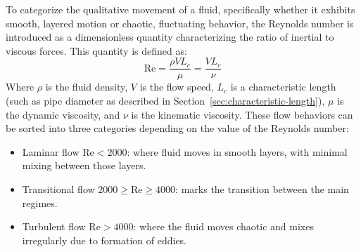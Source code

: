 
To categorize the qualitative movement of a fluid, specifically whether it exhibits smooth, layered motion or chaotic, fluctuating behavior, the Reynolds number is introduced as a dimensionless quantity characterizing the ratio of inertial to viscous forces.
This quantity is defined as:
\begin{equation}
	\mathrm{Re} = \frac{\rho V L_c}{\mu} = \frac{V L_c}{\nu}
	\label{eq:reynolds-number}
\end{equation}
Where $\rho$ is the fluid density, $V$ is the flow speed, $L_c$ is a characteristic length (such as pipe diameter as described in Section~\ref{sec:characteristic-length}), $\mu$ is the dynamic viscosity, and $\nu$ is the kinematic viscosity.
These flow behaviors can be sorted into three categories depending on the value of the Reynolds number:
\cite{Cengel2017, anderson2021modern}
\begin{itemize}
	\item Laminar flow $\mathrm{Re} < 2000$: where fluid moves in smooth layers, with minimal mixing between those layers.
	\item Transitional flow $2000 \ge \mathrm{Re} \ge 4000$: marks the transition between the main regimes.
	\item Turbulent flow $\mathrm{Re} > 4000$: where the fluid moves chaotic and mixes irregularly due to formation of eddies.
\end{itemize}

